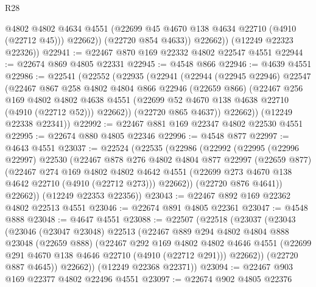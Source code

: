 \begin{lexlean}{R28}
\begin{coremodule}
                @4802
                @4802
                @4634
                @4551
                (@22699 @45 @4670 @138 @4634 @22710 (@4910 (@22712 @45)))
                @22662))
            (@22720 @854 @4633))
          @22662))
      (@12249 @22323 @22326))
@22941 := @22467 @870 @169 @22332 @4802 @22547 @4551
@22944 := @22674 @869 @4805 @22331
@22945 := @4548 @866
@22946 := @4639 @4551
@22986 := @22541
    (@22552
      (@22935
        (@22941
          (@22944
            (@22945 @22946)
            @22547
            (@22467
              @867
              @258
              @4802
              @4804
              @866
              @22946
              (@22659 @866)
              (@22467
                @256
                @169
                @4802
                @4802
                @4638
                @4551
                (@22699 @52 @4670 @138 @4638 @22710 (@4910 (@22712 @52)))
                @22662))
            (@22720 @865 @4637))
          @22662))
      (@12249 @22338 @22341))
@22992 := @22467 @881 @169 @22347 @4802 @22530 @4551
@22995 := @22674 @880 @4805 @22346
@22996 := @4548 @877
@22997 := @4643 @4551
@23037 := @22524
    (@22535
      (@22986
        (@22992
          (@22995
            (@22996 @22997)
            @22530
            (@22467
              @878
              @276
              @4802
              @4804
              @877
              @22997
              (@22659 @877)
              (@22467
                @274
                @169
                @4802
                @4802
                @4642
                @4551
                (@22699 @273 @4670 @138 @4642 @22710 (@4910 (@22712 @273)))
                @22662))
            (@22720 @876 @4641))
          @22662))
      (@12249 @22353 @22356))
@23043 := @22467 @892 @169 @22362 @4802 @22513 @4551
@23046 := @22674 @891 @4805 @22361
@23047 := @4548 @888
@23048 := @4647 @4551
@23088 := @22507
    (@22518
      (@23037
        (@23043
          (@23046
            (@23047 @23048)
            @22513
            (@22467
              @889
              @294
              @4802
              @4804
              @888
              @23048
              (@22659 @888)
              (@22467
                @292
                @169
                @4802
                @4802
                @4646
                @4551
                (@22699 @291 @4670 @138 @4646 @22710 (@4910 (@22712 @291)))
                @22662))
            (@22720 @887 @4645))
          @22662))
      (@12249 @22368 @22371))
@23094 := @22467 @903 @169 @22377 @4802 @22496 @4551
@23097 := @22674 @902 @4805 @22376

\end{coremodule}
\end{lexlean}
